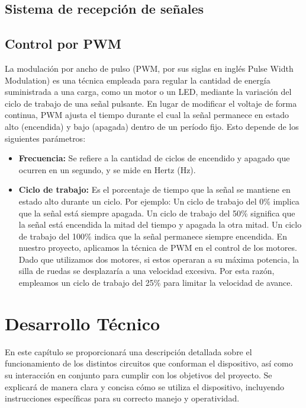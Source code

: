 \documentclass{article}
\begin{document}
\subsection{Sistema de recepción de señales}

\subsection{Control por PWM}
La modulación por ancho de pulso (PWM, por sus siglas en inglés Pulse Width Modulation) es una técnica empleada para regular la cantidad de energía suministrada a una carga, como un motor o un LED, mediante la variación del ciclo de trabajo de una señal pulsante. En lugar de modificar el voltaje de forma continua, PWM ajusta el tiempo durante el cual la señal permanece en estado alto (encendida) y bajo (apagada) dentro de un período fijo. Esto depende de los siguientes parámetros:

\begin{itemize}
    \item \textbf{Frecuencia:} Se refiere a la cantidad de ciclos de encendido y apagado que ocurren en un segundo, y se mide en Hertz (Hz).
    \item \textbf{Ciclo de trabajo:} Es el porcentaje de tiempo que la señal se mantiene en estado alto durante un ciclo. Por ejemplo:
    Un ciclo de trabajo del 0\% implica que la señal está siempre apagada.
    Un ciclo de trabajo del 50\% significa que la señal está encendida la mitad del tiempo y apagada la otra mitad.
    Un ciclo de trabajo del 100\% indica que la señal permanece siempre encendida.
    En nuestro proyecto, aplicamos la técnica de PWM en el control de los motores. Dado que utilizamos dos motores, si estos operaran a su máxima potencia, la silla de ruedas se desplazaría a una velocidad excesiva. Por esta razón, empleamos un ciclo de trabajo del 25\% para limitar la velocidad de avance.
\end{itemize}

\section{Desarrollo Técnico}
En este capítulo se proporcionará una descripción detallada sobre el funcionamiento de los distintos circuitos que conforman el dispositivo, así como su interacción en conjunto para cumplir con los objetivos del proyecto. Se explicará de manera clara y concisa cómo se utiliza el dispositivo, incluyendo instrucciones específicas para su correcto manejo y operatividad.
\end{document}
